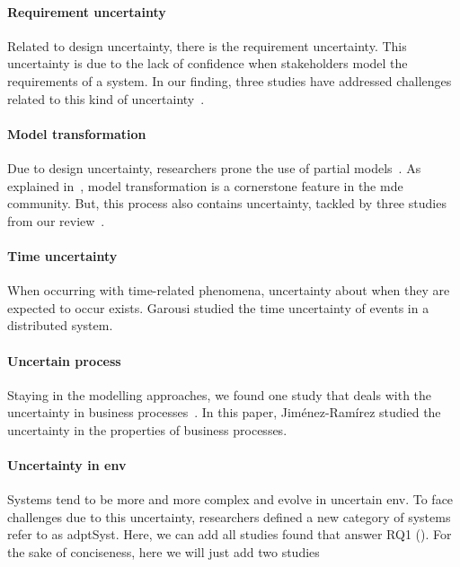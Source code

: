 \paragraph{Requirement uncertainty}
Related to design uncertainty, there is the requirement uncertainty.
This uncertainty is due to the lack of confidence when stakeholders model the requirements of a system.
In our finding, three studies have addressed challenges related to this kind of uncertainty~\cite{DBLP:journals/re/WhittleSBCB10, DBLP:conf/re/WhittleSBCB09, DBLP:journals/re/SalayCHS13}.
	
\paragraph{Model transformation}
Due to design uncertainty, researchers prone the use of partial models~\cite{DBLP:conf/icse/FamelisSC12}.
As explained in~, model transformation is a cornerstone feature in the \gls{mde} community.
But, this process also contains uncertainty, tackled by three studies from our review~\cite{DBLP:conf/models/BurguenoBMV18, DBLP:conf/sle/EramoPR15, DBLP:conf/icse/EramoPR14}.
	
\paragraph{Time uncertainty}
When occurring with time-related phenomena, uncertainty about when they are expected to occur exists.
Garousi \etal studied the time uncertainty of events in a distributed system.
	
\paragraph{Uncertain process}
Staying in the modelling approaches, we found one study that deals with the uncertainty in business processes~\cite{DBLP:journals/infsof/Jimenez-RamirezW0V15}.
In this paper, Jiménez-Ramírez \etal studied the uncertainty in the properties of business processes.	
	
\paragraph{Uncertainty in \gls{env}}
Systems tend to be more and more complex and evolve in uncertain \gls{env}.
To face challenges due to this uncertainty, researchers defined a new category of systems refer to as \gls{adptSyst}.
Here, we can add all studies found that answer RQ1 (\cf {}).
For the sake of conciseness, here we will just add two studies~\cite{DBLP:conf/dagstuhl/EsfahaniM10, DBLP:conf/ecmdafa/ZhangSAYON16}

